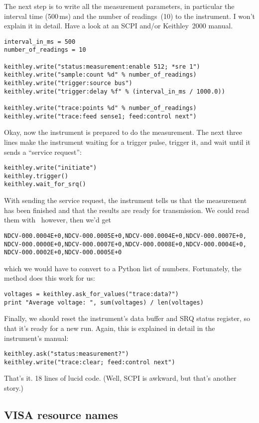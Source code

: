 \documentclass{howto}
\begin{document}
The next step is to write all the measurement parameters, in particular the
interval time (500\,ms) and the number of readings~(10) to the instrument.  I
won't explain it in detail.  Have a look at an SCPI and/or Keithley~2000
manual.
\begin{verbatim}
interval_in_ms = 500
number_of_readings = 10

keithley.write("status:measurement:enable 512; *sre 1")
keithley.write("sample:count %d" % number_of_readings)
keithley.write("trigger:source bus")
keithley.write("trigger:delay %f" % (interval_in_ms / 1000.0))

keithley.write("trace:points %d" % number_of_readings)
keithley.write("trace:feed sense1; feed:control next")
\end{verbatim}
Okay, now the instrument is prepared to do the measurement.  The next three
lines make the instrument waiting for a trigger pulse, trigger it, and wait
until it sends a ``service request'':
\begin{verbatim}
keithley.write("initiate")
keithley.trigger()
keithley.wait_for_srq()
\end{verbatim}
With sending the service request, the instrument tells us that the measurement
has been finished and that the results are ready for transmission.  We could
read them with \ however, then we'd get
\begin{verbatim}
NDCV-000.0004E+0,NDCV-000.0005E+0,NDCV-000.0004E+0,NDCV-000.0007E+0,
NDCV-000.0000E+0,NDCV-000.0007E+0,NDCV-000.0008E+0,NDCV-000.0004E+0,
NDCV-000.0002E+0,NDCV-000.0005E+0
\end{verbatim}
which we would have to convert to a Python list of numbers.  Fortunately, the
 method does this work for us:
\begin{verbatim}
voltages = keithley.ask_for_values("trace:data?")
print "Average voltage: ", sum(voltages) / len(voltages)
\end{verbatim}
Finally, we should reset the instrument's data buffer and SRQ status register,
so that it's ready for a new run.  Again, this is explained in detail in the
instrument's manual:
\begin{verbatim}
keithley.ask("status:measurement?")
keithley.write("trace:clear; feed:control next")
\end{verbatim}
That's it.  18 lines of lucid code.  (Well, SCPI is awkward, but that's another
story.)


\subsection{VISA resource names}
\label{sec:VISA-resource-names}
\end{document}
